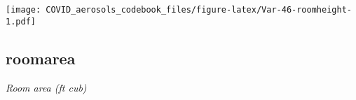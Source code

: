 \documentclass[]{article}
\begin{document}
\begin{minipage}{0.25 \textwidth}

\texttt{[image: COVID\_aerosols\_codebook\_files/figure-latex/Var-46-roomheight-1.pdf]}

\end{minipage}

\noindent\makebox[\linewidth]{\rule{\textwidth}{0.4pt}}

\hypertarget{roomarea}{%
\subsection{roomarea}\label{roomarea}}

\emph{Room area (ft cub)}

\begin{minipage}{0.75 \textwidth}


\end{minipage}
\end{document}
